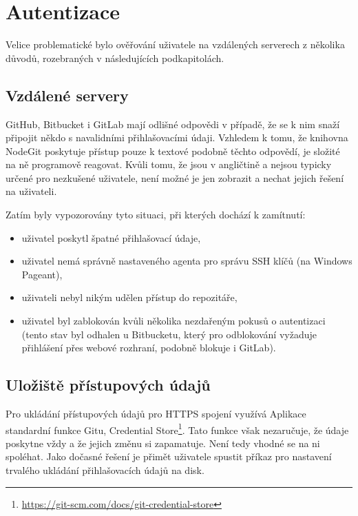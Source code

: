 \section{Autentizace}

Velice problematické bylo ověřování uživatele na vzdálených serverech z několika důvodů, rozebraných v následujících podkapitolách.

\subsection{Vzdálené servery}

GitHub, Bitbucket i GitLab mají odlišné odpovědi v případě, že se k nim snaží připojit někdo s navalidními přihlašovacími údaji. Vzhledem k tomu, že knihovna NodeGit poskytuje přístup pouze k textové podobně těchto odpovědí, je složité na ně programově reagovat. Kvůli tomu, že jsou v angličtině a nejsou typicky určené pro nezkušené uživatele, není možné je jen zobrazit a nechat jejich řešení na uživateli.

Zatím byly vypozorovány tyto situaci, při kterých dochází k zamítnutí:

\begin{itemize}
	\item uživatel poskytl špatné přihlašovací údaje,
	\item uživatel nemá správně nastaveného agenta pro správu SSH klíčů (na Windows Pageant),
	\item uživateli nebyl nikým udělen přístup do repozitáře,
	\item uživatel byl zablokován kvůli několika nezdařeným pokusů o autentizaci (tento stav byl odhalen u Bitbucketu, který pro odblokování vyžaduje přihlášení přes webové rozhraní, podobně blokuje i GitLab).
\end{itemize}

\subsection{Uložiště přístupových údajů}

Pro ukládání přístupových údajů pro HTTPS spojení využívá Aplikace standardní funkce Gitu, Credential Store\footnote{\url{https://git-scm.com/docs/git-credential-store}}. Tato funkce však nezaručuje, že údaje poskytne vždy a že jejich změnu si zapamatuje. Není tedy vhodné se na ni spoléhat. Jako dočasné řešení je přimět uživatele spustit příkaz pro nastavení trvalého ukládání přihlašovacích údajů na disk.

